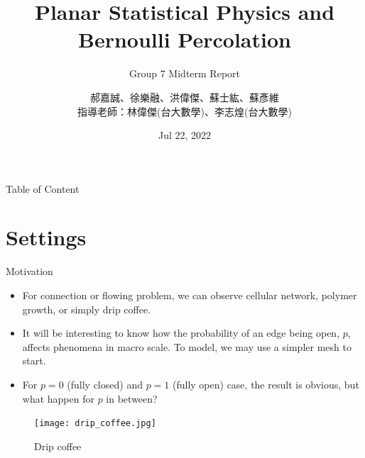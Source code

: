 \documentclass{beamer}
\author{郝嘉誠、徐樂融、洪偉傑、蘇士紘、蘇彥維 \\ 指導老師：林偉傑(台大數學)、李志煌(台大數學)}
\title{Planar Statistical Physics and \\Bernoulli Percolation}
\subtitle{Group 7 Midterm Report}
\institute{NCTS USRP}
\date{Jul 22, 2022}
\begin{document}
\begin{frame}
    
    \titlepage

\end{frame}


\begin{frame}{Table of Content}
    \tableofcontents
\end{frame}

\section{Settings}
\begin{frame}{Motivation}
    \begin{exampleblock}{} %
        \begin{itemize}
            \item For connection or flowing problem, we can observe cellular network, polymer growth, or simply drip coffee.
            \item It will be interesting to know how the probability of an edge being open, $p$, affects phenomena in macro scale. To model, we may use a simpler mesh to start.
            \item For $p = 0$ (fully closed) and $p = 1$ (fully open) case, the result is obvious, but what happen for $p$ in between?
        \end{itemize}
        \begin{figure}[htbp]
            \centering
            \texttt{[image: drip\_coffee.jpg]}
            \captionsetup{labelformat=empty}
            \caption{Drip coffee }
            
        \end{figure}
    \end{exampleblock}
    \
\end{frame}
\end{document}
